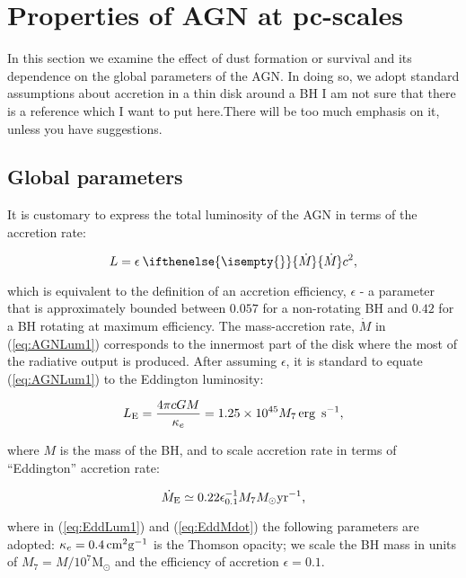 \documentclass[12pt,english,preprint]{aastex}
\newcommand{\red}{\color{red}}
\newcommand{\Mdt}[1][]{ 
    \ifthenelse{\isempty{#1}}
    {\dot{M}_{}}
    { {\dot M}_{{#1}} } 
} %
\begin{document}
\section{Properties of AGN at pc-scales}

In this section we examine the effect of dust formation or survival and its dependence on the global parameters of the 
AGN.   
In doing so, we adopt standard assumptions about accretion in a thin disk around a BH 
{\red I am not sure that there is a reference which I want to put here.There will be too
much emphasis on it, unless you have suggestions}.


\subsection{Global parameters }

It is customary to express the total luminosity of the AGN in terms of the accretion rate:


\begin{equation}
L=\epsilon\:\Mdt c^{2},\label{eq:AGNLum1}
\end{equation}

\noindent which is equivalent to the definition of an accretion efficiency, $\epsilon$ -
a parameter that is approximately bounded between $0.057$
for a non-rotating BH and $0.42$ for a BH rotating at maximum efficiency.
The mass-accretion rate, ${\dot{M}}$ in (\ref{eq:AGNLum1}) corresponds
to the innermost part of the disk where the most of the radiative output
is produced. After assuming $\epsilon$, it is standard to equate (\ref{eq:AGNLum1}) to the Eddington luminosity:



\begin{equation}
L_{{\rm E}}=\frac{4\pi cGM}{\kappa_{e}}=1.25\times10^{45}M_{7}\text{\text{\,erg} }\,{\rm s}^{-1},\label{eq:EddLum1}
\end{equation}

\noindent where $M$ is the mass of the BH, and to scale accretion rate in terms
of ``Eddington'' accretion rate:

\begin{equation}
\dot{M}_{{\rm E}}\simeq0.22\epsilon_{0.1}^{-1}M_{7}M_{\odot}{\rm yr}^{-1}\mbox{,}\label{eq:EddMdot}
\end{equation}


\noindent where in (\ref{eq:EddLum1}) and (\ref{eq:EddMdot}) the following
parameters are adopted: $\kappa_{e}=0.4\,{\rm cm^{2}g^{-1}}$ is the
Thomson opacity; we scale the BH mass in units of $M_{7}=M/10^{7}\text{M}_{\odot}$
and the efficiency of accretion $\epsilon=0.1$. 
\end{document}
